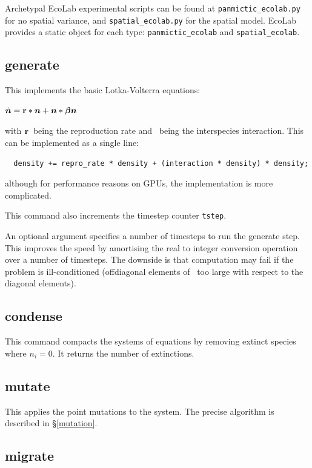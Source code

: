 \documentclass{article}
\newcommand{\br}{\mbox{${\bf r}$}} %
\newcommand{\bbeta}{\mbox{\boldmath{$\beta$}}}   %
\newcommand{\bn}{\mbox{\boldmath{$n$}}}          %
\begin{document}
Archetypal EcoLab experimental scripts can be found at
\verb+panmictic_ecolab.py+ for no spatial variance, and
\verb+spatial_ecolab.py+ for the spatial model. EcoLab provides a
static object for each type: \verb+panmictic_ecolab+ and \verb+spatial_ecolab+.

\subsection{generate}

This implements the basic Lotka-Volterra equations:

\begin{math}
\dot{\bn} = \br*\bn + \bn*\bbeta\bn
\end{math}

with \br\ being the reproduction rate and \bbeta\ being the
interspecies interaction. This can be implemented as a single line:
\begin{verbatim}
  density += repro_rate * density + (interaction * density) * density;
\end{verbatim}
although for performance reasons on GPUs, the implementation is more
complicated.

This command also increments the timestep counter {\tt tstep}.

An optional argument specifies a number of timesteps to run the
generate step. This improves the speed by amortising the real to
integer conversion operation over a number of timesteps. The downside
is that computation may fail if the problem is ill-conditioned
(offdiagonal elements of \bbeta\ too large with respect to the
diagonal elements).

\subsection{condense}\label{condense}

This command compacts the systems of equations by removing extinct
species where $n_i=0$. It returns the number of extinctions.

\subsection{mutate}\label{mutate}

This applies the point mutations to the system. The precise algorithm
is described in \S\ref{mutation}. 

\subsection{migrate}\label{migrate}
\end{document}
